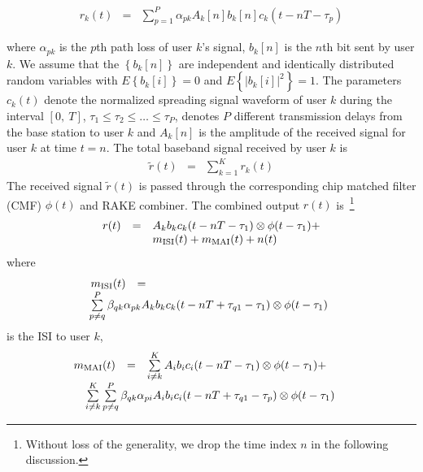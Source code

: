 \documentclass[a4paper,10pt,fleqn, twocolumn]{IEEETran}
\begin{document}
\begin{equation}
\begin{array}{rcl}
r_k(t)&=&\sum\limits_{p=1}^{P}\alpha_{pk}A_k[n]
b_k[n]c_k(t-nT-\tau_p)
\end{array}
\end{equation}

\noindent where $\alpha_{pk}$ is the $p$th path loss of user $k$'s
signal, $b_k{[n]}$ is the $n$th bit sent by user $k$. We assume
that the $\left\{b_k{[n]}\right\}$ are independent and identically
distributed random variables with $E\left\{b_k{[i]}\right\}=0$ and
$E\left\{|b_k{[i]}|^2\right\}=1$. The parameters $c_k(t)$ denote
the normalized spreading signal waveform of user $k$ during the
interval $[0,\ T]$, $\tau_1\leq\tau_2\leq\ldots\leq\tau_P$,
denotes $P$ different transmission delays from the base station to
user $k$ and $A_k[n]$ is the amplitude of the received signal for
user $k$ at time $t=n$. The total baseband signal received by user
$k$ is
\begin{equation}
\begin{array}{rcl}
\tilde{r}(t)&=&\sum\limits_{k=1}^{K}r_k(t)
\end{array}
\end{equation}
The received signal $\tilde{r}(t)$ is passed through the
corresponding chip matched filter (CMF) $\phi(t)$ and RAKE
combiner. The combined output $r(t)$ is~\footnote{Without loss of
the generality, we drop the time index $n$ in the following
discussion.}
\begin{equation}\hspace{-0.0in}
\begin{array}{rcl}
r(t)&=&A_k b_k c_k(t-nT-\tau_1)\otimes \phi(t-\tau_1)+ \\
&&\hspace{0.0in} m_{\rm ISI}(t) + m_{\rm MAI}(t) + n(t)
\end{array}\label{r_t}
\end{equation}
\noindent where
\begin{equation} \hspace{-0.05in}
\begin{array}{rcl}
 m_{\rm ISI}(t)&=&\\
 &&\hspace{-0.83in}\sum\limits^{P}_{p\neq
q}\beta_{qk} \alpha_{pk}A_kb_kc_k(t-nT+\tau_{q1}-\tau_1)\otimes
\phi(t-\tau_1)
\end{array}
\end{equation}
\noindent is the ISI to user $k$,
\begin{equation} \hspace{-0.17in}
\begin{array}{rcl}
m_{\rm MAI}(t)&=&\sum\limits_{i\neq
 k}^{K}A_ib_ic_i(t-nT-\tau_1)\otimes\phi(t-\tau_1)+\\
 &&\hspace{-0.75in}\sum\limits_{i\neq
 k}^{K}\sum\limits^{P}_{p\neq
q}\beta_{qk}
\alpha_{pi}A_ib_ic_i(t-nT+\tau_{q1}-\tau_p)\otimes\phi(t-\tau_1)
\end{array}
\end{equation}
\end{document}
